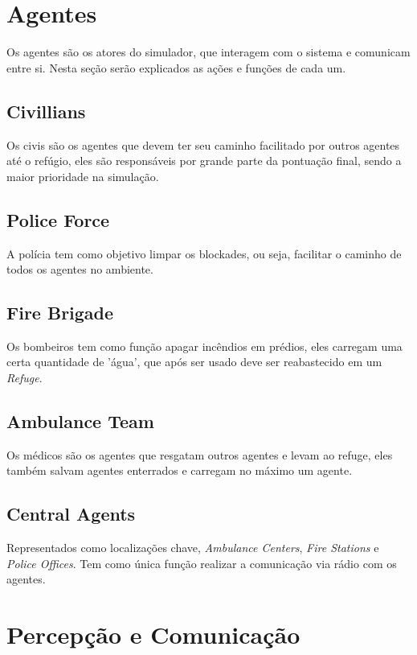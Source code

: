 \documentclass[conference]{IEEEtran}
\begin{document}
\section{Agentes}
Os agentes são os atores do simulador, que interagem com o sistema e comunicam entre si. Nesta seção serão explicados as ações e funções de cada um.
\subsection{Civillians}
Os civis são os agentes que devem ter seu caminho facilitado por outros agentes até o refúgio, eles são responsáveis por grande parte da pontuação final, sendo a maior prioridade na simulação.
\subsection{Police Force}
A polícia tem como objetivo limpar os blockades, ou seja, facilitar o caminho de todos os agentes no ambiente.
\subsection{Fire Brigade}
Os bombeiros tem como função apagar incêndios em prédios, eles carregam uma certa quantidade de 'água', que após ser usado deve ser reabastecido em um \textit{Refuge}.
\subsection{Ambulance Team}
Os médicos são os agentes que resgatam outros agentes e levam ao refuge, eles também salvam agentes enterrados e carregam no máximo um agente.
\subsection{Central Agents}
Representados como localizações chave, \textit{Ambulance Centers}, \textit{Fire Stations} e \textit{Police Offices}. Tem como única função realizar a comunicação via rádio com os agentes.

\section{Percepção e Comunicação}
\end{document}
